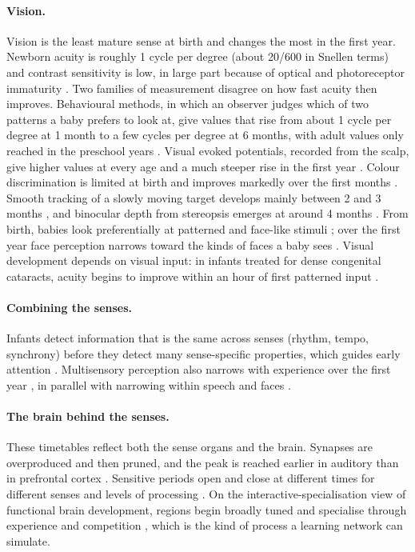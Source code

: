 \documentclass{article}
\begin{document}
\paragraph{Vision.} Vision is the least mature sense at birth and changes the most in the first year. Newborn acuity is roughly 1 cycle per degree (about 20/600 in Snellen terms) and contrast sensitivity is low, in large part because of optical and photoreceptor immaturity \autocite{banks1988optical}. Two families of measurement disagree on how fast acuity then improves. Behavioural methods, in which an observer judges which of two patterns a baby prefers to look at, give values that rise from about 1 cycle per degree at 1 month to a few cycles per degree at 6 months, with adult values only reached in the preschool years \autocite{mayer1995monocular,teller1997first}. Visual evoked potentials, recorded from the scalp, give higher values at every age and a much steeper rise in the first year \autocite{norcia1985spatial,dobson1978visual}. Colour discrimination is limited at birth \autocite{adams1994systematic} and improves markedly over the first months \autocite{braddick2011development}. Smooth tracking of a slowly moving target develops mainly between 2 and 3 months \autocite{vonhofsten1997development}, and binocular depth from stereopsis emerges at around 4 months \autocite{held1980stereoacuity}. From birth, babies look preferentially at patterned and face-like stimuli \autocite{fantz1963pattern,johnson1991newborns}; over the first year face perception narrows toward the kinds of faces a baby sees \autocite{pascalis2002species,kelly2007other}. Visual development depends on visual input: in infants treated for dense congenital cataracts, acuity begins to improve within an hour of first patterned input \autocite{maurer1999rapid}.

\paragraph{Combining the senses.} Infants detect information that is the same across senses (rhythm, tempo, synchrony) before they detect many sense-specific properties, which guides early attention \autocite{bahrick2000intersensory}. Multisensory perception also narrows with experience over the first year \autocite{lewkowicz2009emergence}, in parallel with narrowing within speech and faces \autocite{maurer2014perceptual}.

\paragraph{The brain behind the senses.} These timetables reflect both the sense organs and the brain. Synapses are overproduced and then pruned, and the peak is reached earlier in auditory than in prefrontal cortex \autocite{huttenlocher1997regional}. Sensitive periods open and close at different times for different senses and levels of processing \autocite{hensch2005critical,werker2015critical}. On the interactive-specialisation view of functional brain development, regions begin broadly tuned and specialise through experience and competition \autocite{johnson2001functional}, which is the kind of process a learning network can simulate.
\end{document}
